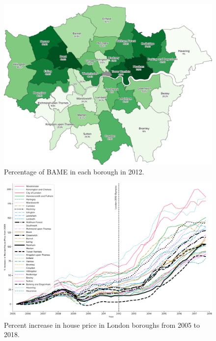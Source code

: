 \documentclass[12pt,twoside]{article}
\begin{document}
\begin{figure}[!htb]
\centering
\includegraphics[width=0.8\linewidth]{figures/2012-borough-demographics.pdf}
\caption{Percentage of BAME in each borough in 2012.}
\label{fig:2012-borough-demographics}
\end{figure}

\begin{figure}[!htb]
\centering
\includegraphics[width=0.8\linewidth]{figures/house-price-percent-change-boroughs.pdf}
\caption{Percent increase in house price in London boroughs from 2005 to 2018.}
\label{fig:house-price-percent-change-boroughs}
\end{figure}
\end{document}
